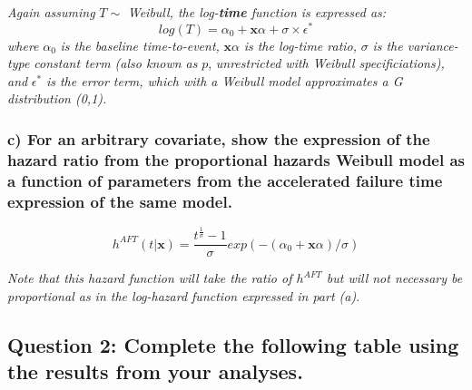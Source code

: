 \documentclass[]{article}
\begin{document}
\emph{Again assuming} \(T \sim\) \emph{Weibull, the log-\textbf{time}
function is expressed as:} \[
log(T) = \alpha_0 + \boldsymbol{x}\alpha + \sigma \times \epsilon^\ast
\] \emph{where} \(\alpha_0\) \emph{is the baseline time-to-event,}
\(\boldsymbol{x}\alpha\) \emph{is the log-time ratio,} \(\sigma\)
\emph{is the variance-type constant term (also known as} \(p\),
\emph{unrestricted with Weibull specificiations), and} \(\epsilon^\ast\)
\emph{is the error term, which with a Weibull model approximates a G
distribution (0,1).}

\vspace{6pt}

\subsubsection{c) For an arbitrary covariate, show the expression of the
hazard ratio from the proportional hazards Weibull model as a function
of parameters from the accelerated failure time expression of the same
model.}\label{c-for-an-arbitrary-covariate-show-the-expression-of-the-hazard-ratio-from-the-proportional-hazards-weibull-model-as-a-function-of-parameters-from-the-accelerated-failure-time-expression-of-the-same-model.}

\[h^{AFT}(t|\boldsymbol{x}) = \frac{t^{\frac{1}{\sigma}} - 1}{\sigma}exp(-(\alpha_0 + \boldsymbol{x}\alpha)/\sigma)\]

\emph{Note that this hazard function will take the ratio of \(h^{AFT}\)
but will not necessary be proportional as in the log-hazard function
expressed in part (a)}.

\vspace{12pt}

\subsection{Question 2: Complete the following table using the results
from your
analyses.}\label{question-2-complete-the-following-table-using-the-results-from-your-analyses.}
\end{document}
